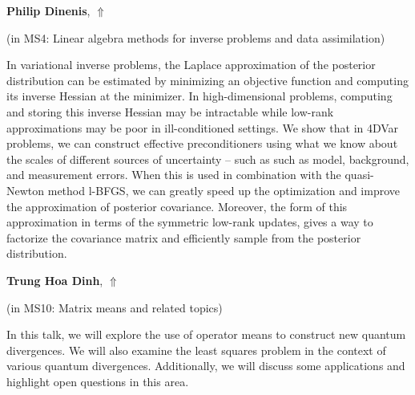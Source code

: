 \documentclass[ILAS2025-program.tex]{subfiles}
\begin{document}
\hypertarget{down0357}{}\begin{ilasabstract}
    
\textbf{Philip Dinenis},  \hfill \hyperlink{up0357}{$\Uparrow$}
    
    
(in {\color{mstitle}MS4: Linear algebra methods for inverse problems and data assimilation})
        
\mtskip
    In variational inverse problems, the Laplace approximation of the posterior distribution can be estimated by minimizing an objective function and computing its inverse Hessian at the minimizer. In high-dimensional problems, computing and storing this inverse Hessian may be intractable while low-rank approximations may be poor in ill-conditioned settings. We show that in 4DVar problems, we can construct effective preconditioners using what we know about the scales of different sources of uncertainty – such as such as model, background, and measurement errors. When this is used in combination with the quasi-Newton method l-BFGS, we can greatly speed up the optimization and improve the approximation of posterior covariance. Moreover, the form of this approximation in terms of the symmetric low-rank updates, gives a way to factorize the covariance matrix and efficiently sample from the posterior distribution.

\end{ilasabstract}
    

\hypertarget{down0254}{}\begin{ilasabstract}
    
\textbf{Trung Hoa Dinh},  \hfill \hyperlink{up0254}{$\Uparrow$}
    
    
(in {\color{mstitle}MS10: Matrix means and related topics})
        
\mtskip
    In this talk, we will explore the use of operator means to construct new quantum divergences. We will also examine the least squares problem in the context of various quantum divergences. Additionally, we will discuss some applications and highlight open questions in this area.

\end{ilasabstract}
    
\end{document}
